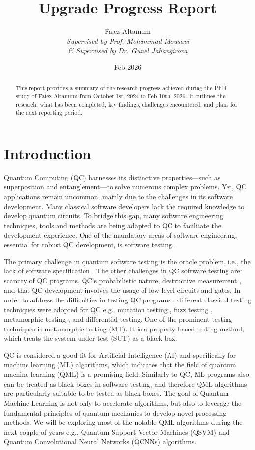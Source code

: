 \documentclass[12pt,a4paper]{article}
\title{Upgrade Progress Report}
\author{Faiez Altamimi
	\\ \textit{Supervised by Prof. Mohammad Mousavi}
	\\ \textit{\& Supervised by Dr. Gunel Jahangirova}
}
\date{Feb 2026}
\begin{document}
	
	\maketitle 
	
	\begin{abstract}
		This report provides a summary of the research progress achieved during the PhD study of Faiez Altamimi from October 1st, 2024 to Feb 10th, 2026. It outlines the research, what has been completed, key findings, challenges encountered, and plans for the next reporting period.
	\end{abstract}
	
	\tableofcontents 
	\newpage 
	
	\section{Introduction}
	\label{sec:introduction}
	
	Quantum Computing (QC) harnesses its distinctive properties—such as superposition and entanglement—to solve numerous complex problems. Yet, QC applications remain uncommon, mainly due to the challenges in its software development. Many classical software developers lack the required knowledge to develop quantum circuits. To bridge this gap, many software engineering techniques, tools and methods are being adapted to QC to facilitate the development experience. One of the mandatory areas of software engineering, essential for robust QC development, is software testing.
	
	The primary challenge in quantum software testing is the oracle problem, i.e., the lack of software specification \cite{9036058}. The other challenges in QC software testing are: scarcity of QC programs, QC's probabilistic nature, destructive measurement \cite{wang2023qucatcombinatorialtestingtool}, and that QC development involves the usage of low-level circuits and gates. In order to address the difficulties in testing QC programs \cite{garousi2020software}, different classical testing techniques were adopted for QC e.g., mutation testing \cite{9844849}, fuzz testing \cite{wang2018quanfuzzfuzztestingquantum}, metamorphic testing \cite{rabreu2022}, and differential testing. One of the prominent testing techniques is metamorphic testing (MT). It is a property-based testing method, which treats the system under test (SUT) as a black box. 
	
	 QC is considered a good fit for Artificial Intelligence (AI) and specifically for machine learning (ML) algorithms, which indicates that the field of quantum machine learning (QML) is a promising field. Similarly to QC, ML programs also can be treated as black boxes in software testing, and therefore QML algorithms are particularly suitable to be tested as black boxes. The goal of Quantum Machine Learning is not only to accelerate algorithms, but also to leverage the fundamental principles of quantum mechanics to develop novel processing methods. We will be exploring most of the notable QML algorithms during the next couple of years e.g., Quantum Support Vector Machines (QSVM) and Quantum Convolutional Neural Networks (QCNNs) algorithms.
	
\end{document}
